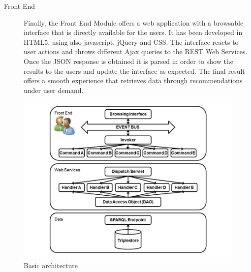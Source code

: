 \begin{description}
  \item[Front End] Finally, the Front End Module offers a web application with a browsable interface that is directly available for the users. It has been developed in HTML5, using also javascript, jQuery and CSS. The interface reacts to user actions and throws different Ajax queries to the REST Web Services. Once the JSON response is obtained it is parsed in order to show the results to the users and update the interface as expected. The final result offers a smooth experience that retrieves data through recommendations under user demand.
\end{description}
\begin{figure}[!hbt]
\centering
\includegraphics[scale=0.3]{img/APAarchitecture.jpg}
\caption{Basic architecture}
\label{fig:arch}
\end{figure}

